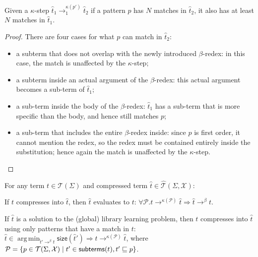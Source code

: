 \documentclass[acmsmall,screen,nonacm,review=false,timestamp=false]{acmart}
\newcommand{\sz}{\mathsf{size}}
\newcommand{\termsof}[1]{\mathcal{T}(#1)}
\newcommand{\patsof}[2]{\mathcal{T}(#1,#2)}
\newcommand{\absof}[2]{\hat{\mathcal{T}}(#1,#2)}
\newcommand{\sub}{\sqsubseteq}
\newcommand{\rwsteps}[1]{\rightarrow^{#1}_1}
\newcommand{\rewrites}[1]{\rightarrow^{#1}}
\newcommand{\evals}{\rewrites{\beta}}
\DeclareMathOperator*{\argmin}{arg\,min}
\newcommand{\patset}{\mathcal{P}}
\begin{document}
\begin{lemma}
Given a $\kappa$-step $\hat{t}_1 \rwsteps{\kappa(p')} \hat{t}_2$
  if a pattern $p$ has $N$ matches in $\hat{t}_2$, it also has at least $N$ matches in $\hat{t}_1$.
  \label{lem:pat-match}
\end{lemma}
\begin{proof}
  There are four cases for what $p$ can match in $\hat{t}_2$:
  \begin{itemize}
  \item a subterm that does not overlap with the newly introduced $\beta$-redex: in this case, the match is unaffected by the $\kappa$-step;
  \item a subterm inside an actual argument of the $\beta$-redex: this actual argument becomes a sub-term of $\hat{t}_1$;
  \item a sub-term inside the body of the $\beta$-redex: $\hat{t}_1$ has a sub-term that is more specific than the body, and hence still matches $p$;
  \item a sub-term that includes the entire $\beta$-redex inside: since $p$ is first order, it cannot mention the redex, so the redex must be contained entirely inside the substitution; 
  hence again the match is unaffected by the $\kappa$-step.
  \end{itemize}
\end{proof}

\begin{theorem}
  For any term $t \in \termsof{\Sigma}$ and compressed term $\hat{t} \in \absof{\Sigma}{\mathcal{X}}$:
  \begin{description}[font=\itshape]
    \item[(Soundness)] If $t$ compresses into $\hat{t}$, then $\hat{t}$ evaluates to $t$: $\forall \patset . t \rewrites{\kappa(\patset)} \hat{t} \Longrightarrow \hat{t} \evals t$.
    \item[(Completeness)] If $\hat{t}$ is a solution to the (global) library learning problem, 
    then $t$ compresses into $\hat{t}$ using only patterns that have a match in $t$:
    $\hat{t} \in \argmin_{\hat{t}' \evals t} \sz(\hat{t}') \Longrightarrow t \rewrites{\kappa(\patset)} \hat{t}$, 
    where $\patset = \{p \in \patsof{\Sigma}{\mathcal{X}} \mid t' \in \subterms(t) , t' \sub p\}$.
  \end{description}
\label{thm:pat-lib-learning-app}
\end{theorem} 
\end{document}
